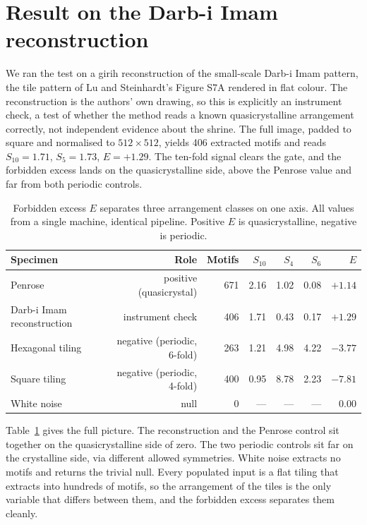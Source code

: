 \documentclass[11pt]{article}
\begin{document}
\section{Result on the Darb-i Imam reconstruction}

We ran the test on a girih reconstruction of the small-scale Darb-i Imam pattern,
the tile pattern of Lu and Steinhardt's Figure S7A rendered in flat colour. The
reconstruction is the authors' own drawing, so this is explicitly an instrument
check, a test of whether the method reads a known quasicrystalline arrangement
correctly, not independent evidence about the shrine. The full image, padded to
square and normalised to $512 \times 512$, yields 406 extracted motifs and reads
$S_{10} = 1.71$, $S_5 = 1.73$, $E = +1.29$. The ten-fold signal clears the gate,
and the forbidden excess lands on the quasicrystalline side, above the Penrose
value and far from both periodic controls.

\begin{table}[t]
\centering
\small
\caption{Forbidden excess $E$ separates three arrangement classes on one axis.
All values from a single machine, identical pipeline. Positive $E$ is
quasicrystalline, negative is periodic.}
\label{tab:results}
\begin{tabular}{lrrrrrr}
\toprule
Specimen & Role & Motifs & $S_{10}$ & $S_4$ & $S_6$ & $E$ \\
\midrule
Penrose & positive (quasicrystal) & 671 & 2.16 & 1.02 & 0.08 & $+1.14$ \\
Darb-i Imam reconstruction & instrument check & 406 & 1.71 & 0.43 & 0.17 & $+1.29$ \\
Hexagonal tiling & negative (periodic, 6-fold) & 263 & 1.21 & 4.98 & 4.22 & $-3.77$ \\
Square tiling & negative (periodic, 4-fold) & 400 & 0.95 & 8.78 & 2.23 & $-7.81$ \\
White noise & null & 0 & --- & --- & --- & 0.00 \\
\bottomrule
\end{tabular}
\end{table}

Table~\ref{tab:results} gives the full picture. The reconstruction and the
Penrose control sit together on the quasicrystalline side of zero. The two
periodic controls sit far on the crystalline side, via different allowed
symmetries. White noise extracts no motifs and returns the trivial null. Every
populated input is a flat tiling that extracts into hundreds of motifs, so the
arrangement of the tiles is the only variable that differs between them, and the
forbidden excess separates them cleanly.
\end{document}

